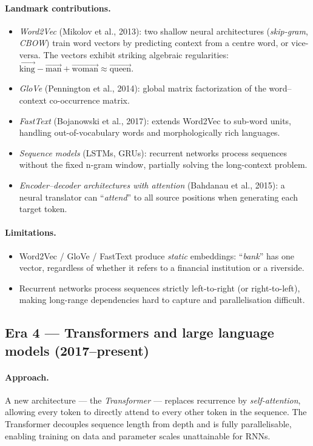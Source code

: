 \paragraph{Landmark contributions.}
\begin{itemize}
    \item \emph{Word2Vec} (Mikolov et al., 2013): two shallow neural architectures (\emph{skip-gram}, \emph{CBOW}) train word vectors by predicting context from a centre word, or vice-versa. The vectors exhibit striking algebraic regularities: $\overrightarrow{\text{king}} - \overrightarrow{\text{man}} + \overrightarrow{\text{woman}} \approx \overrightarrow{\text{queen}}$.
    \item \emph{GloVe} (Pennington et al., 2014): global matrix factorization of the word--context co-occurrence matrix.
    \item \emph{FastText} (Bojanowski et al., 2017): extends Word2Vec to sub-word units, handling out-of-vocabulary words and morphologically rich languages.
    \item \emph{Sequence models} (LSTMs, GRUs): recurrent networks process sequences without the fixed n-gram window, partially solving the long-context problem.
    \item \emph{Encoder--decoder architectures with attention} (Bahdanau et al., 2015): a neural translator can ``\emph{attend}'' to all source positions when generating each target token.
\end{itemize}

\paragraph{Limitations.}
\begin{itemize}
    \item Word2Vec / GloVe / FastText produce \emph{static} embeddings: ``\emph{bank}'' has one vector, regardless of whether it refers to a financial institution or a riverside.
    \item Recurrent networks process sequences strictly left-to-right (or right-to-left), making long-range dependencies hard to capture and parallelisation difficult.
\end{itemize}

\subsection{Era 4 --- Transformers and large language models (2017--present)}

\paragraph{Approach.} A new architecture --- the \emph{Transformer} --- replaces recurrence by \emph{self-attention}, allowing every token to directly attend to every other token in the sequence. The Transformer decouples sequence length from depth and is fully parallelisable, enabling training on data and parameter scales unattainable for RNNs.

